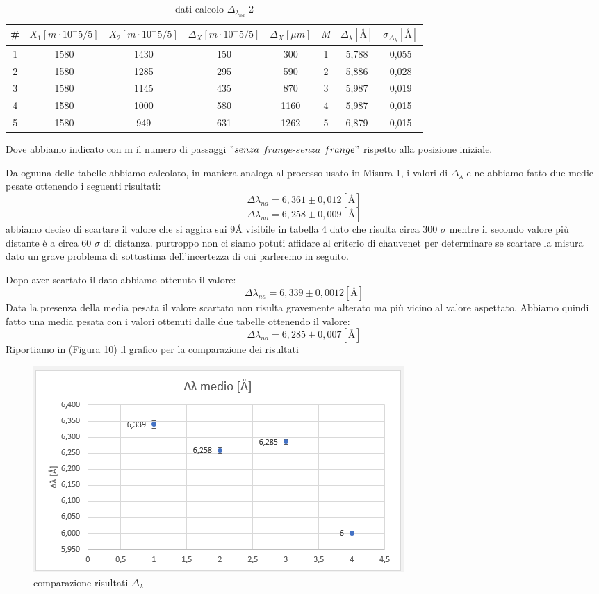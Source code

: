 \documentclass{article}
\begin{document}
\begin{table}[h!]
\centering
\begin{tabular}{ | c | c | c | c | c | c | c | c |}
\hline
 \# & $X_1 [m \cdot 10^-5/5]$ & $X_2 [m \cdot 10^-5/5]$ & $\Delta_X [m \cdot 10^-5/5]$ & $\Delta_X [\mu m]$ & $M$ & $\Delta_\lambda [\textrm{Å}]$ & $\sigma_{\Delta_\lambda} [\textrm{Å}]$\\
\hline
   1 & 1580 & 1430 & 150 & 300 & 1 & 5,788 & 0,055\\
   2 & 1580 & 1285 & 295 & 590 & 2 & 5,886 & 0,028\\
   3 & 1580 & 1145 & 435 & 870 & 3 & 5,987 & 0,019\\
   4 & 1580 & 1000 & 580 & 1160 & 4 & 5,987 & 0,015\\
   5 & 1580 & 949 & 631 & 1262 & 5 & 6,879 & 0,015\\
\hline
\end{tabular}
\caption{dati calcolo $\Delta_{\lambda_{na}}$ 2}
\label{table:5}
\end{table}


\pagebreak
Dove abbiamo indicato con m il numero di passaggi $"senza$ $frange$-$senza$ $frange"$ rispetto alla posizione iniziale.

Da ognuna delle tabelle abbiamo calcolato, in maniera analoga al processo usato in Misura 1, i valori di $\Delta_\lambda$ e ne abbiamo fatto due medie pesate ottenendo i seguenti risultati:
\[ \Delta \lambda_{na} = 6,361 \pm 0,012 [\textrm{Å}] \]
\[ \Delta \lambda_{na} = 6,258 \pm 0,009 [\textrm{Å}] \]
abbiamo deciso di scartare il valore che si aggira sui $9 \textrm{Å}$ visibile in tabella 4 dato che risulta circa 300 $\sigma$ mentre il secondo valore più distante è a circa 60 $\sigma$ di distanza. purtroppo non ci siamo potuti affidare al criterio di chauvenet per determinare se scartare la misura dato un grave problema di sottostima dell'incertezza di cui parleremo in seguito.

Dopo aver scartato il dato abbiamo ottenuto il valore:
\[ \Delta \lambda_{na} = 6,339 \pm 0,0012 [\textrm{Å}] \]
Data la presenza della media pesata il valore scartato non risulta gravemente alterato ma più vicino al valore aspettato.
Abbiamo quindi fatto una media pesata con i valori ottenuti dalle due tabelle ottenendo il valore:
\[ \Delta \lambda_{na} = 6,285 \pm 0,007 [\textrm{Å}] \]
Riportiamo in (Figura 10) il grafico per la comparazione dei risultati


\begin{figure}[h!]
  \centering
  \includegraphics[width=0.6\linewidth]{IM grafico risultati delta lambda}
  \caption{comparazione risultati $\Delta_\lambda$}
\end{figure}
\end{document}
